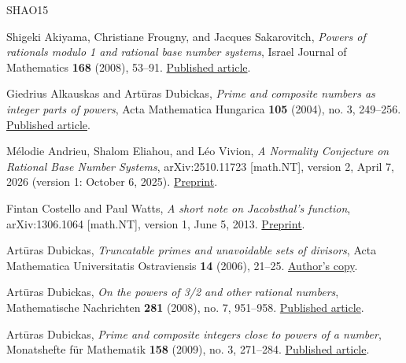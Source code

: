 \documentclass[11pt,reqno]{amsart}
\theoremstyle{definition}
\theoremstyle{remark}
\begin{document}
\begin{thebibliography}{SHAO15}

\label{ref-afs08}
Shigeki Akiyama, Christiane Frougny, and Jacques Sakarovitch,
\emph{Powers of rationals modulo 1 and rational base number systems},
Israel Journal of Mathematics \textbf{168} (2008), 53--91.
\href{https://doi.org/10.1007/s11856-008-1056-4}{Published article}.

\label{ref-ad04}
Giedrius Alkauskas and Artūras Dubickas, \emph{Prime and composite
numbers as integer parts of powers}, Acta Mathematica Hungarica
\textbf{105} (2004), no. 3, 249--256.
\href{https://doi.org/10.1023/B:AMHU.0000049291.38284.2c}{Published article}.

\label{ref-aev26}
Mélodie Andrieu, Shalom Eliahou, and Léo Vivion, \emph{A
Normality Conjecture on Rational Base Number Systems}, arXiv:2510.11723
{[}math.NT{]}, version 2, April 7, 2026 (version 1: October 6, 2025).
\href{https://arxiv.org/abs/2510.11723v2}{Preprint}.

\label{ref-cw13}
Fintan Costello and Paul Watts, \emph{A short note on
Jacobsthal's function}, arXiv:1306.1064 {[}math.NT{]}, version 1, June 5,
2013. \href{https://arxiv.org/abs/1306.1064v1}{Preprint}.

\label{ref-dub06}
Artūras Dubickas, \emph{Truncatable primes and unavoidable sets of
divisors}, Acta Mathematica Universitatis Ostraviensis \textbf{14}
(2006), 21--25.
\href{https://klevas.mif.vu.lt/~dubickas/files/dvifai/cekko1.pdf}{Author's copy}.

\label{ref-dub08}
Artūras Dubickas, \emph{On the powers of 3/2 and other rational
numbers}, Mathematische Nachrichten \textbf{281} (2008), no. 7, 951--958.
\href{https://doi.org/10.1002/mana.200510651}{Published article}.

\label{ref-dub09}
Artūras Dubickas, \emph{Prime and composite integers close to powers of
a number}, Monatshefte für Mathematik \textbf{158} (2009), no. 3,
271--284. \href{https://doi.org/10.1007/s00605-008-0042-6}{Published article}.


\end{thebibliography}
\end{document}
